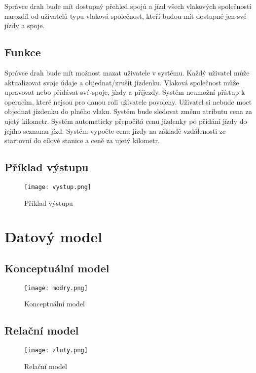 \documentclass[11pt]{article}
\begin{document}
Správce drah bude mít dostupný přehled spojů a jízd všech vlakových společností narozdíl od uživatelů typu vlaková společnost, kteří budou mít dostupné jen své jízdy a spoje.

\subsection{Funkce}
Správce drah bude mít možnost mazat uživatele v systému. Každý uživatel může aktualizovat svoje údaje a objednat/zrušit jízdenku. Vlaková společnost může upravovat nebo přidávat své spoje, jízdy a příjezdy. Systém neumožní přístup k operacím, které nejsou pro danou roli uživatele povoleny. Uživatel si nebude moct objednat jízdenku do plného vlaku. Systém bude sledovat změnu atributu cena za ujetý kilometr. Systém automaticky přepočítá cenu jízdenky po přidání jízdy do jejího seznamu jízd. Systém vypočte cenu jízdy na základě vzdálenosti ze startovní do cílové stanice a ceně za ujetý kilometr.

\subsection{Příklad výstupu}
\begin{figure}[H]
    \texttt{[image: vystup.png]}
    \centering
    \caption{Příklad výstupu}
    \label{vystup}
\end{figure}

\newpage

\section{Datový model}

\subsection{Konceptuální model}
\begin{figure}[H]
    \texttt{[image: modry.png]}
    \centering
    \caption{Konceptuální model}
    \label{konceptualni}
\end{figure}

\subsection{Relační model}
\begin{figure}[H]
    \texttt{[image: zluty.png]}
    \centering
    \caption{Relační model}
    \label{relacni}
\end{figure}
\end{document}
